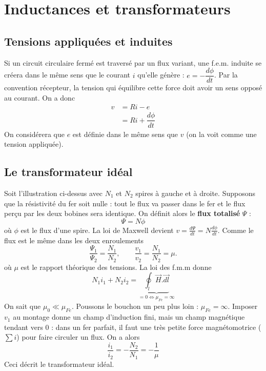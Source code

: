 \chapter{Inductances et transformateurs}
\section{Tensions appliquées et induites}
Si un circuit circulaire fermé est traversé par un flux variant, 
une f.e.m. induite se créera dans le même sens que le courant $i$ 
qu'elle génère : $e = -\dfrac{d\phi}{dt}$. Par la convention 
récepteur, la tension qui équilibre cette force doit avoir un 
sens opposé au courant. On a donc
\begin{equation}
\begin{array}{ll}
v &= Ri - e\\
 &= Ri + \dfrac{d\phi}{dt}
\end{array}
\end{equation}
On considérera que $e$ est définie dans le même sens que $v$ (on 
la voit comme une tension appliquée).

\section{Le transformateur idéal}
Soit l'illustration ci-dessus avec $N_1$ et $N_2$ spires à gauche 
et à droite. Supposons que la résistivité du fer soit nulle : tout 
le flux va passer dans le fer et le flux perçu par les deux bobines 
sera identique. On définit alors le \textbf{flux totalisé} $\Psi$ :
\begin{equation}
\Psi = N\phi
\end{equation}
où $\phi$ est le flux d'une spire. La loi de Maxwell devient $v = 
\frac{d\Psi}{dt} = N\frac{d\phi}{dt}$. Comme le flux est le même 
dans les deux enroulements
\begin{equation}
\frac{\Psi_1}{\Psi_2} = \dfrac{N_1}{N_2},\qquad \frac{v_1}{v_2} = 
\frac{N_1}{N_2} = \mu.
\end{equation}
où $\mu$ est le rapport théorique des tensions. La loi des f.m.m 
donne
\begin{equation}
N_1i_1 + N_2i_2 = \underbrace{\oint_l \vec{H}.\vec{dl}}_{=0
\Leftrightarrow \mu_{Fe}=\infty}
\end{equation}
On sait que $\mu_0 \ll \mu_{Fe}$. Poussons le bouchon un peu plus 
loin : $\mu_{Fe} = \infty$. Imposer $v_1$ au montage donne un champ 
d'induction fini, mais un champ magnétique tendant vers 0 : dans un 
fer parfait, il faut une très petite force magnétomotrice ($\sum i$) 
pour faire circuler un flux. On a alors
\begin{equation}
\frac{i_1}{i_2} = -\frac{N_2}{N_1} = -\frac{1}{\mu}
\end{equation}
Ceci décrit le transformateur idéal.



